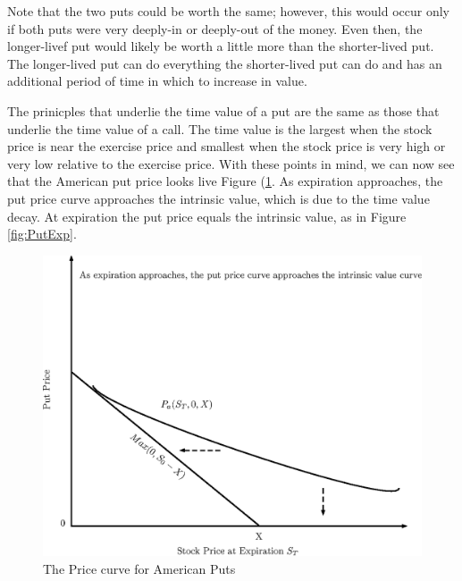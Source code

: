 \documentclass{book}
\theoremstyle{definition}
\theoremstyle{remark}
\begin{document}
            Note that the two puts could be worth the same; however, this would occur only if both puts were very deeply-in or deeply-out of the money. Even then, the longer-livef put would likely be worth a little more than the shorter-lived put. The longer-lived put can do everything the shorter-lived put can do and has an additional period of time in which to increase in value. 
                
            The prinicples that underlie the time value of a put are the same as those that underlie the time value of a call. The time value is the largest when the stock price is near the exercise price and smallest when the stock price is very high or very low relative to the exercise price. With these points in mind, we can now see that the American put price looks live Figure (\ref{fig:APutExp}. As expiration approaches, the put price curve approaches the intrinsic value, which is due to the time value decay. At expiration the put price equals the intrinsic value, as in Figure \ref{fig:PutExp}. 

                \begin{figure}[h]
                    \centering
                        \includegraphics[scale=0.45]{images/fig:APutExp.eps}
                    \caption{The Price curve for American Puts}
                    \label{fig:APutExp}                
                \end{figure}
            
\end{document}

